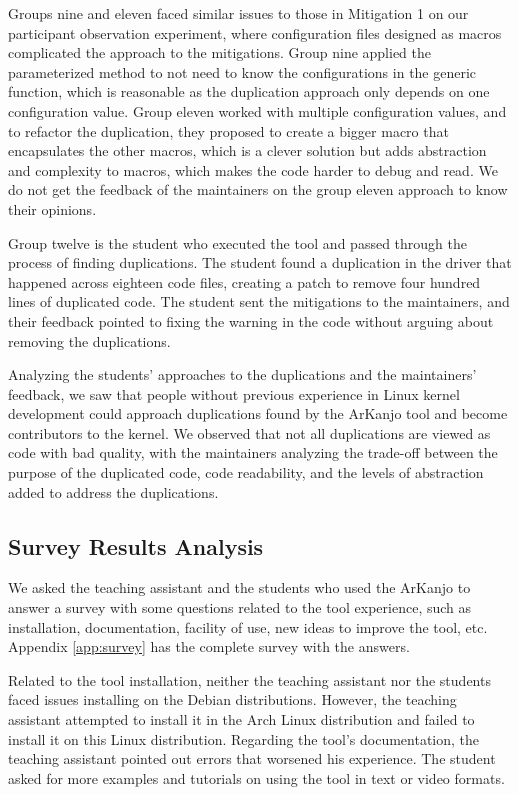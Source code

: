 Groups nine and eleven faced similar issues to those in Mitigation 1 on our participant observation 
experiment, where configuration files designed as macros complicated the approach to the mitigations. 
Group nine applied the parameterized method to not need to know the configurations in the 
generic function, which is reasonable as the duplication approach only depends on one configuration 
value. Group eleven worked with multiple configuration values, and to refactor the duplication, 
they proposed to create a bigger macro that encapsulates the other macros, which is a clever 
solution but adds abstraction and complexity to macros, which makes the code harder to debug and read.
We do not get the feedback of the maintainers on the group eleven approach to know their opinions.

Group twelve is the student who executed the tool and passed through the process of finding 
duplications. The student found a duplication in the driver that happened across eighteen code files, 
creating a patch to remove four hundred lines of duplicated code. The student sent the mitigations 
to the maintainers, and their feedback pointed to fixing the warning in the code without arguing 
about removing the duplications.

Analyzing the students' approaches to the duplications and the maintainers' feedback, we saw that 
people without previous experience in Linux kernel development could approach duplications found 
by the ArKanjo tool and become contributors to the kernel. We observed that not all duplications 
are viewed as code with bad quality, with the maintainers analyzing the trade-off between the 
purpose of the duplicated code, code readability, and the levels of abstraction added to 
address the duplications.

\subsection{Survey Results Analysis}

We asked the teaching assistant and the students who used the ArKanjo to answer a survey with 
some questions related to the tool experience, such as installation, documentation, facility of 
use, new ideas to improve the tool, etc. Appendix \ref{app:survey} has the complete survey 
with the answers.

Related to the tool installation, neither the teaching assistant nor the students faced issues 
installing on the Debian distributions. However, the teaching assistant attempted to install it 
in the Arch Linux distribution and failed to install it on this Linux distribution. 
Regarding the tool's documentation, the teaching assistant pointed out errors that worsened his 
experience. The student asked for more examples and tutorials on using the tool in text or 
video formats.

